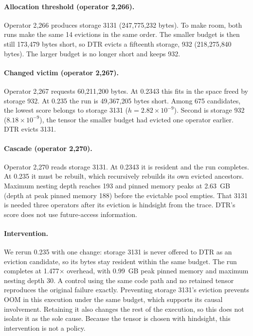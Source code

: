 \documentclass[11pt]{article}
\begin{document}
\paragraph{Allocation threshold (operator 2{,}266).} Operator 2{,}266 produces storage 3131
(247{,}775{,}232 bytes). To make room, both runs make the same 14 evictions in the same
order. The smaller budget is then still 173{,}479 bytes short, so DTR evicts a fifteenth
storage, 932 (218{,}275{,}840 bytes). The larger budget is no longer short and keeps 932.

\paragraph{Changed victim (operator 2{,}267).} Operator 2{,}267 requests 60{,}211{,}200
bytes. At 0.2343 this fits in the space freed by storage 932. At 0.235 the run is
49{,}367{,}205 bytes short. Among 675 candidates, the lowest score belongs to storage 3131
($h = 2.82\times10^{-9}$). Second is storage 932 ($8.18\times10^{-9}$), the tensor the
smaller budget had evicted one operator earlier. DTR evicts 3131.

\paragraph{Cascade (operator 2{,}270).} Operator 2{,}270 reads storage 3131. At 0.2343 it is
resident and the run completes. At 0.235 it must be rebuilt, which recursively rebuilds its
own evicted ancestors. Maximum nesting depth reaches 193 and pinned memory peaks at 2.63~GB
(depth at peak pinned memory 188) before the evictable pool empties. That 3131 is needed
three operators after its eviction is hindsight from the trace. DTR's score does not use
future-access information.

\paragraph{Intervention.} We rerun 0.235 with one change: storage 3131 is never offered to
DTR as an eviction candidate, so its bytes stay resident within the same budget. The run
completes at 1.477$\times$ overhead, with 0.99~GB peak pinned memory and maximum nesting
depth 30. A control using the same code path and no retained tensor reproduces the original
failure exactly. Preventing storage 3131's eviction prevents OOM in this execution under the
same budget, which supports its causal involvement. Retaining it also changes the rest of
the execution, so this does not isolate it as the sole cause. Because the tensor is chosen
with hindsight, this intervention is not a policy.
\end{document}
